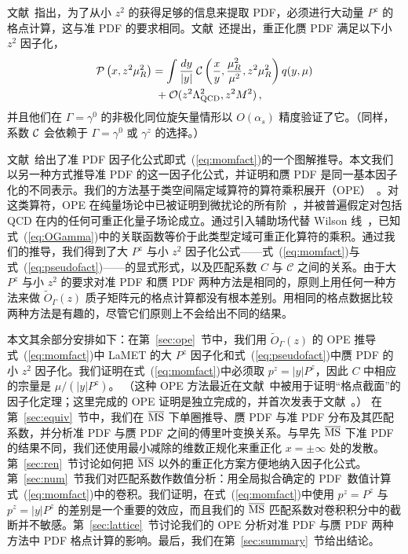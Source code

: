 文献~\cite{Ji:2017rah}指出，为了从小 $z^2$ 的\spcorr 获得足够的信息来提取 PDF，必须进行大动量 $P^z$ 的格点计算，这与准 PDF 的要求相同。文献~\cite{Ji:2017rah}还提出，重正化赝 PDF 满足以下小 $z^2$ 因子化，
\begin{align} \label{eq:pseudofact}
	\mathcal{P} \left( x, z^2\mu_R^2\right)
  &= \int {dy\over |y|}\: \mathcal{C}\left({x\over y}, {\mu_R^2\over \mu^2},z^2\mu_R^2\right) q(y,\mu)
   \\
  &\ + {\cal O}(z^2\Lambda_{\rm QCD}^2, z^2 M^2) \,,\nonumber
\end{align}
并且他们在 $\Gamma=\gamma^0$ 的非极化同位旋矢量情形以 $O(\alpha_s)$ 精度验证了它。（同样，系数 ${\cal C}$ 会依赖于 $\Gamma=\gamma^0$ 或 $\gamma^z$ 的选择。）

文献~\cite{Ma:2014jla}给出了准 PDF 因子化公式即式~(\ref{eq:momfact})的一个图解推导。本文我们以另一种方式推导准 PDF 的这一因子化公式，并证明\spcorr 和赝 PDF 是同一基本因子化的不同表示。我们的方法基于类空间隔定域算符的算符乘积展开（OPE）~\cite{Wilson:1969zs}。对这类算符，OPE 在纯量场论中已被证明到微扰论的所有阶~\cite{Brandt:1967rb,Wilson:1972ee,Zimmermann:1972tv}，并被普遍假定对包括 QCD 在内的任何可重正化量子场论成立。通过引入辅助场代替 Wilson 线~\cite{Dorn:1986dt}，已知式~(\ref{eq:OGamma})中的关联函数等价于此类型定域可重正化算符的乘积。通过我们的推导，我们得到了大 $P^z$ 与小 $z^2$ 因子化公式——式~(\ref{eq:momfact})与式~(\ref{eq:pseudofact})——的显式形式，以及匹配系数 $C$ 与 $\mathcal{C}$ 之间的关系。由于大 $P^z$ 与小 $z^2$ 的要求对准 PDF 和赝 PDF 两种方法是相同的，原则上用任何一种方法来做 $\tilde{O}_{\Gamma}(z)$ 质子矩阵元的格点计算都没有根本差别。用相同的格点数据比较两种方法是有趣的，尽管它们原则上不会给出不同的结果。

本文其余部分安排如下：在第~\ref{sec:ope}~节中，我们用 $\tilde{O}_\Gamma(z)$ 的 OPE 推导式~(\ref{eq:momfact})中 LaMET 的大 $P^z$ 因子化和式~(\ref{eq:pseudofact})中赝 PDF 的小 $z^2$ 因子化。我们证明在式~(\ref{eq:momfact})中必须取 $p^z=|y|P^z$，因此 $C$ 中相应的宗量是 $\mu/(|y|P^z)$。
（这种 OPE 方法最近在文献~\cite{Ma:2017pxb}中被用于证明``格点截面''的因子化定理；这里完成的 OPE 证明是独立完成的，并首次发表于文献~\cite{Zhao:2017int}。）
%
在第~\ref{sec:equiv}~节中，我们在 $\overline{\rm MS}$ 下单圈推导\spcorr、赝 PDF 与准 PDF 分布及其匹配系数，并分析准 PDF 与赝 PDF 之间的傅里叶变换关系。与早先 $\overline{\rm MS}$ 下准 PDF 的结果不同，我们还使用最小减除的维数正规化来重正化 $x=\pm\infty$ 处的发散。第~\ref{sec:ren}~节讨论如何把 $\overline{\rm MS}$ 以外的重正化方案方便地纳入因子化公式。
%
第~\ref{sec:num}~节我们对匹配系数作数值分析：用全局拟合确定的 PDF~\cite{Martin:2009iq}数值计算式~(\ref{eq:momfact})中的卷积。我们证明，在式~(\ref{eq:momfact})中使用 $p^z=P^z$ 与 $p^z=|y|P^z$ 的差别是一个重要的效应，而且我们的 $\overline{\rm MS}$ 匹配系数对卷积积分中的截断并不敏感。第~\ref{sec:lattice}~节讨论我们的 OPE 分析对准 PDF 与赝 PDF 两种方法中 PDF 格点计算的影响。最后，我们在第~\ref{sec:summary}~节给出结论。
